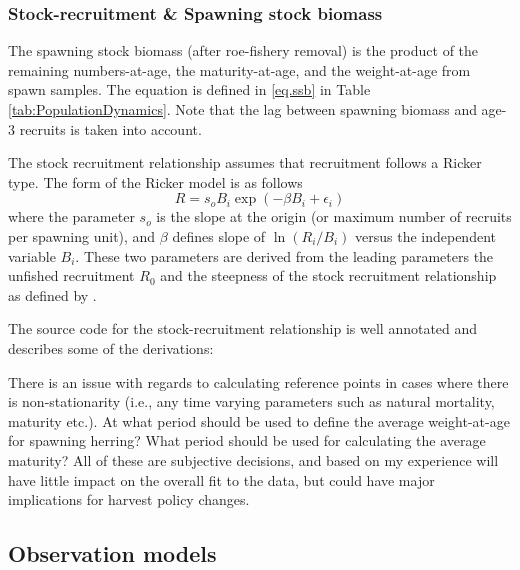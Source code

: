 \documentclass[12pt,letterpaper]{article}
\begin{document}
    \subsubsection{Stock-recruitment \& Spawning stock biomass} %
    \label{ssub:stock_recruitment_&_spawning_stock_biomass}
    The spawning stock biomass (after roe-fishery removal) is the product of the remaining numbers-at-age, the maturity-at-age, and the weight-at-age from spawn samples.  The equation is defined in \eqref{eq.ssb} in Table \ref{tab:PopulationDynamics}.  Note that the lag between spawning biomass and age-3 recruits is taken into account.

    The stock recruitment relationship assumes that recruitment follows a Ricker type.  The form  of the Ricker model is as follows \[ R = s_o B_i \exp(-\beta B_i + \epsilon_i)\] where the parameter $s_o$ is the slope at the origin (or maximum number of recruits per spawning unit), and $\beta$ defines slope of $\ln(R_i/B_i)$ versus the independent variable $B_i$.  These two parameters are derived from the leading parameters the unfished recruitment $R_0$ and the steepness of the stock recruitment relationship as defined by \citep{mace1988generalised}.

    The source code for the stock-recruitment relationship is well annotated and describes some of the derivations:
    \begin{small}
    
      
    \end{small}

    There is an issue with regards to calculating reference points in cases where there is non-stationarity (i.e., any time varying parameters such as natural mortality, maturity etc.).  At what period should be used to define the average weight-at-age for spawning herring? What period should be used for calculating the average maturity?  All of these are subjective decisions, and based on my experience will have little impact on the overall fit to the data, but could have major implications for harvest policy changes. 


  \subsection{Observation models} %
  \label{sub:observation_models}
\end{document}
